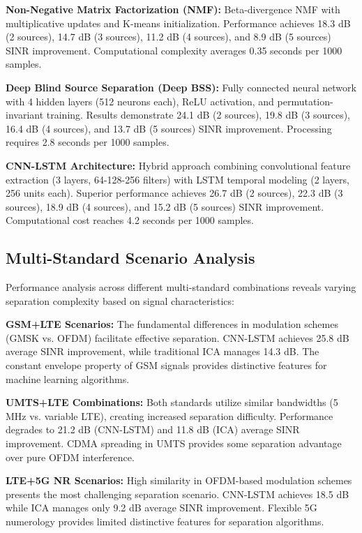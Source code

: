\documentclass[twocolumn]{article}
\begin{document}
\textbf{Non-Negative Matrix Factorization (NMF):} Beta-divergence NMF with multiplicative updates and K-means initialization. Performance achieves 18.3 dB (2 sources), 14.7 dB (3 sources), 11.2 dB (4 sources), and 8.9 dB (5 sources) SINR improvement. Computational complexity averages 0.35 seconds per 1000 samples.

\textbf{Deep Blind Source Separation (Deep BSS):} Fully connected neural network with 4 hidden layers (512 neurons each), ReLU activation, and permutation-invariant training. Results demonstrate 24.1 dB (2 sources), 19.8 dB (3 sources), 16.4 dB (4 sources), and 13.7 dB (5 sources) SINR improvement. Processing requires 2.8 seconds per 1000 samples.

\textbf{CNN-LSTM Architecture:} Hybrid approach combining convolutional feature extraction (3 layers, 64-128-256 filters) with LSTM temporal modeling (2 layers, 256 units each). Superior performance achieves 26.7 dB (2 sources), 22.3 dB (3 sources), 18.9 dB (4 sources), and 15.2 dB (5 sources) SINR improvement. Computational cost reaches 4.2 seconds per 1000 samples.

\subsection{Multi-Standard Scenario Analysis}

Performance analysis across different multi-standard combinations reveals varying separation complexity based on signal characteristics:

\textbf{GSM+LTE Scenarios:} The fundamental differences in modulation schemes (GMSK vs. OFDM) facilitate effective separation. CNN-LSTM achieves 25.8 dB average SINR improvement, while traditional ICA manages 14.3 dB. The constant envelope property of GSM signals provides distinctive features for machine learning algorithms.

\textbf{UMTS+LTE Combinations:} Both standards utilize similar bandwidths (5 MHz vs. variable LTE), creating increased separation difficulty. Performance degrades to 21.2 dB (CNN-LSTM) and 11.8 dB (ICA) average SINR improvement. CDMA spreading in UMTS provides some separation advantage over pure OFDM interference.

\textbf{LTE+5G NR Scenarios:} High similarity in OFDM-based modulation schemes presents the most challenging separation scenario. CNN-LSTM achieves 18.5 dB while ICA manages only 9.2 dB average SINR improvement. Flexible 5G numerology provides limited distinctive features for separation algorithms.
\end{document}
